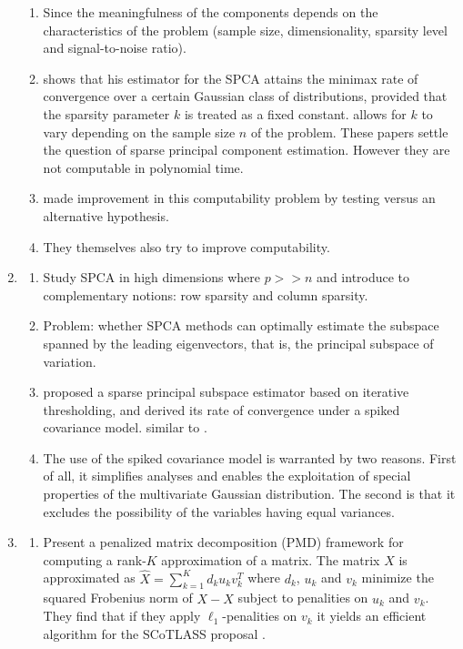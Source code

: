 \documentclass{article}
\begin{document}
\begin{enumerate}
\begin{enumerate}
        \item Since the meaningfulness of the components depends on the characteristics of the problem (sample size, dimensionality, sparsity level and signal-to-noise ratio).
        \item \cite{Ma2013} shows that his estimator for the SPCA attains the minimax rate of convergence over a certain Gaussian class of distributions, provided that the sparsity parameter $k$ is treated as a fixed constant. \cite{Cai2013, Vu2013} allows for $k$ to vary depending on the sample size $n$ of the problem. These papers settle the question of sparse principal component estimation. However they are not computable in polynomial time.
        \item \cite{Berthet2013} made improvement in this computability problem by testing versus an alternative hypothesis.
        \item They themselves also try to improve computability.
    \end{enumerate}
    \item \cite{Vu2013}
    \begin{enumerate}
        \item Study SPCA in high dimensions where $p>>n$ and introduce to complementary notions: row sparsity and column sparsity.
        \item Problem: whether SPCA methods can optimally estimate the subspace spanned by the leading eigenvectors, that is, the principal subspace of variation.
        \item \cite{Ma2013} proposed a sparse principal subspace estimator based on iterative thresholding, and derived its rate of convergence under a spiked covariance model.
        similar to \cite{Birnbaum2013}.
        \item The use of the spiked covariance model is warranted by two reasons. First of all, it simplifies analyses and enables the exploitation of special properties of the multivariate Gaussian distribution. The second is that it excludes the possibility of the variables having equal variances.
    \end{enumerate}
    \item \cite{Witten2009}
    \begin{enumerate}
        \item Present a penalized matrix decomposition (PMD) framework for computing a rank-$K$ approximation of a matrix. The matrix $X$ is approximated as $\hat{X}=\sum_{k=1}^K d_k u_k v_k^T$ where $d_k$, $u_k$ and $v_k$ minimize the squared Frobenius norm of $X-\hat{X}$ subject to penalities on $u_k$ and $v_k$. They find that if they apply $\ell_1$-penalities on $v_k$ it yields an efficient algorithm for the SCoTLASS proposal \cite{Jolliffe2003}.
    \end{enumerate}
\end{enumerate}



\end{document}
